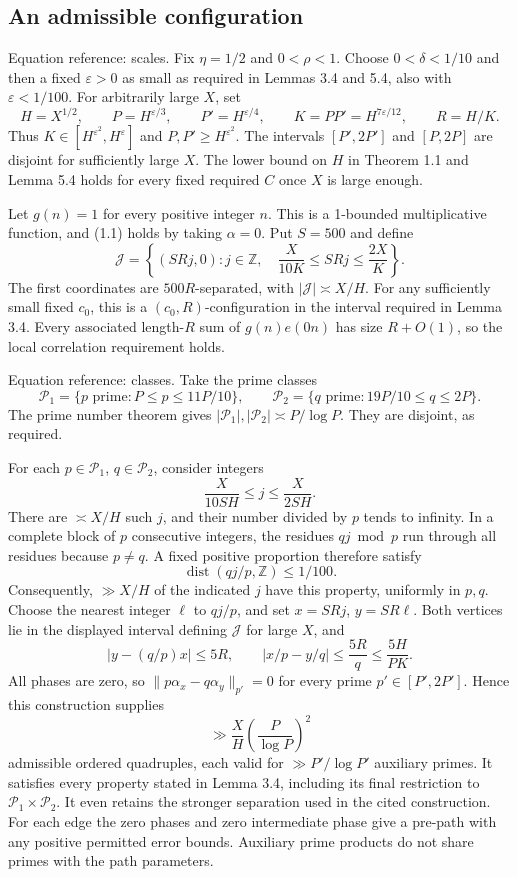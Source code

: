 \documentclass[10pt]{article}
\begin{document}
\subsection*{An admissible configuration}
Equation reference: scales. Fix \(\eta=1/2\) and \(0<\rho<1\). Choose \(0<\delta<1/10\) and then a fixed \(\varepsilon>0\) as small as required in Lemmas 3.4 and 5.4, also with \(\varepsilon<1/100\). For arbitrarily large \(X\), set \[
 H=X^{1/2},\qquad P=H^{\varepsilon/3},\qquad
 P'=H^{\varepsilon/4},\qquad K=PP'=H^{7\varepsilon/12},
 \qquad R=H/K.\] Thus \(K\in[H^{\varepsilon^2},H^\varepsilon]\) and \(P,P'\ge H^{\varepsilon^2}\). The intervals \([P',2P']\) and \([P,2P]\) are disjoint for sufficiently large \(X\). The lower bound on \(H\) in Theorem 1.1 and Lemma 5.4 holds for every fixed required \(C\) once \(X\) is large enough.\par
Let \(g(n)=1\) for every positive integer \(n\). This is a 1-bounded multiplicative function, and (1.1) holds by taking \(\alpha=0\). Put \(S=500\) and define \[\mathcal J=\left\{(SRj,0):
    j\in\mathbb Z,\quad \frac{X}{10K}\le SRj\le\frac{2X}{K}\right\}.\] The first coordinates are \(500R\)-separated, with \(|\mathcal J|\asymp X/H\). For any sufficiently small fixed \(c_0\), this is a \((c_0,R)\)-configuration in the interval required in Lemma 3.4. Every associated length-\(R\) sum of \(g(n)e(0n)\) has size \(R+O(1)\), so the local correlation requirement holds.\par
Equation reference: classes. Take the prime classes \[
 \mathcal P_1=\{p\text{ prime}:P\le p\le 11P/10\},\qquad
 \mathcal P_2=\{q\text{ prime}:19P/10\le q\le2P\}.\] The prime number theorem gives \(|\mathcal P_1|,|\mathcal P_2|\asymp P/\log P\). They are disjoint, as required.\par
For each \(p\in\mathcal P_1\), \(q\in\mathcal P_2\), consider integers \[\frac{X}{10SH}\le j\le\frac{X}{2SH}.\] There are \(\asymp X/H\) such \(j\), and their number divided by \(p\) tends to infinity. In a complete block of \(p\) consecutive integers, the residues \(qj\bmod p\) run through all residues because \(p\ne q\). A fixed positive proportion therefore satisfy \[\operatorname{dist}(qj/p,\mathbb Z)\le 1/100.\] Consequently, \(\gg X/H\) of the indicated \(j\) have this property, uniformly in \(p,q\). Choose the nearest integer \(\ell\) to \(qj/p\), and set \(x=SRj\), \(y=SR\ell\). Both vertices lie in the displayed interval defining \(\mathcal J\) for large \(X\), and \[|y-(q/p)x|\le5R,\qquad
 |x/p-y/q|\le\frac{5R}{q}\le\frac{5H}{PK}.\] All phases are zero, so \(\|p\alpha_x-q\alpha_y\|_{p'}=0\) for every prime \(p'\in[P',2P']\). Hence this construction supplies \[\gg \frac XH\left(\frac P{\log P}\right)^2\] admissible ordered quadruples, each valid for \(\gg P'/\log P'\) auxiliary primes. It satisfies every property stated in Lemma 3.4, including its final restriction to \(\mathcal P_1\times\mathcal P_2\). It even retains the stronger separation used in the cited construction. For each edge the zero phases and zero intermediate phase give a pre-path with any positive permitted error bounds. Auxiliary prime products do not share primes with the path parameters.\par
\end{document}
